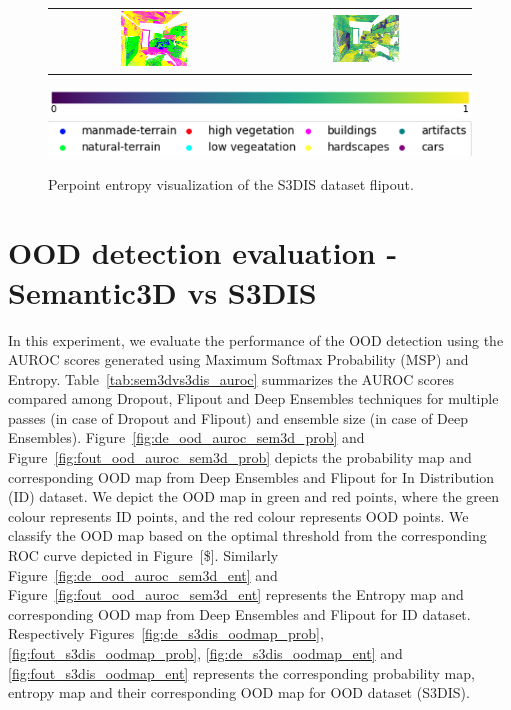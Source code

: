 \begin{figure}[h!]
\begin{tabular}{cc}
            \includegraphics[width=0.33\textwidth, height=0.18\textheight]{images/seg_output/s3dis_DE/office_42.pdf}& 
            \includegraphics[width=0.33\textwidth, height=0.18\textheight]{images/seg_output/flipout/ent_fout_s3dis_4.pdf}\\
        \end{tabular}
        \includegraphics[scale=0.45]{images/prob_legend.pdf}
        \includegraphics[scale=0.65]{images/legend.png}
        \caption{Perpoint entropy visualization of the S3DIS dataset flipout.}
        \label{fig:fout_s3dis_entmap}
    \end{figure}
    \FloatBarrier
    \section{OOD detection evaluation - Semantic3D vs S3DIS}
    In this experiment, we evaluate the performance of the OOD detection using the AUROC scores generated using Maximum Softmax Probability (MSP) and Entropy.
    Table~\ref{tab:sem3dvs3dis_auroc} summarizes the AUROC scores compared among Dropout, Flipout and Deep Ensembles techniques for multiple passes (in case of Dropout and Flipout) and ensemble size (in case of Deep Ensembles).
    Figure~\ref{fig:de_ood_auroc_sem3d_prob} and Figure~\ref{fig:fout_ood_auroc_sem3d_prob} depicts the probability map and corresponding OOD map from Deep Ensembles and Flipout for In Distribution (ID) dataset.
    We depict the OOD map in green and red points, where the green colour represents ID points, and the red colour represents OOD points.
    We classify the OOD map based on the optimal threshold from the corresponding ROC curve depicted in Figure~[\$].
    Similarly Figure~\ref{fig:de_ood_auroc_sem3d_ent} and Figure~\ref{fig:fout_ood_auroc_sem3d_ent} represents the Entropy map and corresponding OOD map from Deep Ensembles and Flipout for ID dataset.
    Respectively Figures~\ref{fig:de_s3dis_oodmap_prob}, \ref{fig:fout_s3dis_oodmap_prob}, \ref{fig:de_s3dis_oodmap_ent} and \ref{fig:fout_s3dis_oodmap_ent} represents the corresponding probability map, entropy map and their corresponding OOD map for OOD dataset (S3DIS).
    

